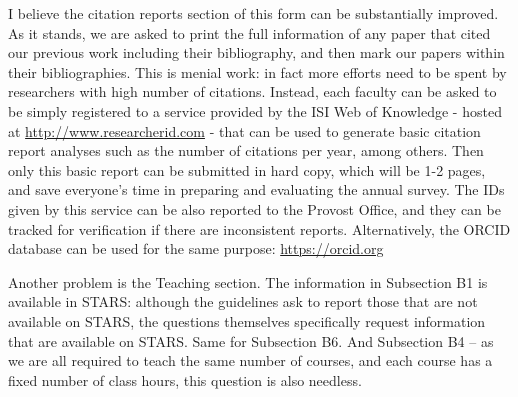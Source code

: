 
I believe the citation reports section of this form can be substantially improved. As it stands, we are asked to print the full information of any paper that cited our previous work including their bibliography, and then mark our papers within their bibliographies. This is menial work: in fact more efforts need to be spent by researchers with high number of citations. Instead, each faculty can be asked to be simply registered to a service provided by the ISI Web of Knowledge - hosted at \url{http://www.researcherid.com} - that can be used to generate basic citation report analyses such as the number of citations per year, among others. Then only this basic report can be submitted in hard copy, which will be 1-2 pages, and save everyone’s time in preparing and evaluating the annual survey. The IDs given by this service can be also reported to the Provost Office, and they can be tracked for verification if there are inconsistent reports. Alternatively, the ORCID database can be used for the same purpose: \url{https://orcid.org}

Another problem is the Teaching section. The information in Subsection B1 is available in STARS: although the guidelines ask to report those that are not available on STARS, the questions themselves specifically request information that are available on STARS. Same for Subsection B6. And Subsection B4 -- as we are all required to teach the same number of courses, and each course has a fixed number of class hours, this question is also needless.
